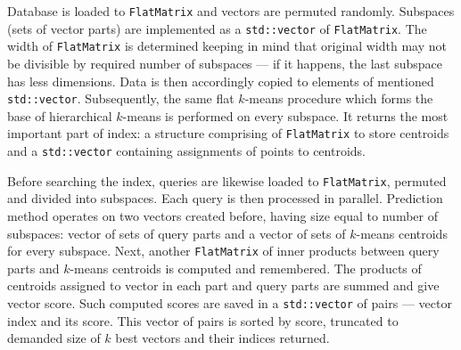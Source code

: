 Database is loaded to \texttt{FlatMatrix} and vectors are permuted randomly.
Subspaces (sets of vector parts) are implemented as a \texttt{std::vector} of \texttt{FlatMatrix}.
The width of \texttt{FlatMatrix} is determined keeping in mind that original width may not be
divisible by required number of subspaces --- if it happens, the last subspace has less dimensions.
Data is then accordingly copied to elements of mentioned \texttt{std::vector}.
Subsequently, the same flat $k$-means procedure which forms the base of hierarchical $k$-means
is performed on every subspace. It returns the most important part of index:
a structure comprising of \texttt{FlatMatrix} to store centroids and a \texttt{std::vector}
containing assignments of points to centroids.

Before searching the index, queries are likewise loaded to \texttt{FlatMatrix}, permuted and divided into subspaces.
Each query is then processed in parallel.
Prediction method operates on two vectors created before, having size equal to number of subspaces:
vector of sets of query parts and a vector of sets of $k$-means centroids for every subspace.
Next, another \texttt{FlatMatrix} of inner products between query parts and $k$-means centroids
is computed and remembered.
The products of centroids assigned to vector in each part and query parts are summed and give vector score.
Such computed scores are saved in a \texttt{std::vector} of pairs --- vector index and its score.
This vector of pairs is sorted by score, truncated to demanded size of $k$ best vectors and their indices returned.
